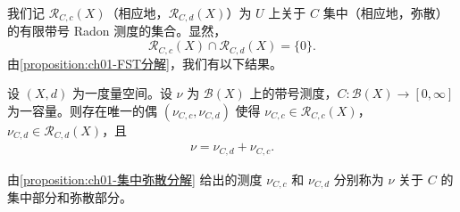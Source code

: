 \documentclass[../../main.tex]{subfiles}%
\begin{document}
我们记 $\mathscr{R}_{C,c}(X)$（相应地，$\mathscr{R}_{C,d}(X)$）为 $U$ 上关于 $C$ 集中（相应地，弥散）的有限带号 Radon 测度的集合。显然，
\[
\mathscr{R}_{C,c}(X)\cap\mathscr{R}_{C,d}(X)=\{0\}.
\]
由\cref{proposition:ch01-FST分解}，我们有以下结果。

\begin{proposition}\label{proposition:ch01-集中弥散分解}
设 $(X,d)$ 为一度量空间。设 $\nu$ 为 $\mathcal{B}(X)$ 上的带号测度，$C:\mathcal{B}(X)\to[0,\infty]$ 为一容量。则存在唯一的偶 $(\nu_{C,c},\nu_{C,d})$ 使得 $\nu_{C,c}\in\mathscr{R}_{C,c}(X)$，$\nu_{C,d}\in\mathscr{R}_{C,d}(X)$，且
\begin{align}
\nu=\nu_{C,d}+\nu_{C,c}. \label{align:ch01-集中弥散分解式}
\end{align}
\end{proposition}

\begin{definition}\label{definition:ch01-集中弥散部分}
由\cref{proposition:ch01-集中弥散分解} 给出的测度 $\nu_{C,c}$ 和 $\nu_{C,d}$ 分别称为 $\nu$ 关于 $C$ 的集中部分和弥散部分。
\end{definition}
\end{document}
